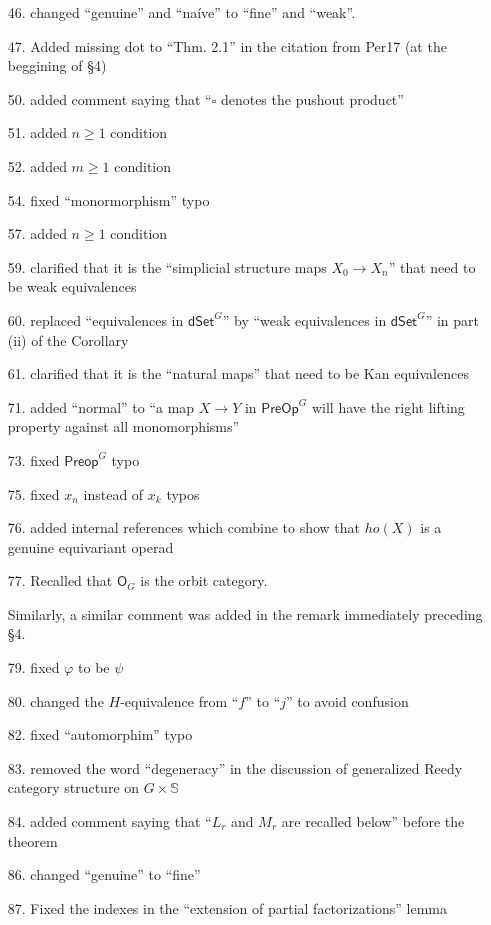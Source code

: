 \documentclass{article}
\begin{document}
\begin{itemize}
\item[46.] changed ``genuine'' and ``na\'ive'' to ``fine'' and ``weak''.
\item[47.] Added missing dot to ``Thm. 2.1'' in the citation from Per17 (at the beggining of \S 4)
\item[50.] added comment saying that ``$\square$ denotes the pushout product''
\item[51.] added $n \geq 1$ condition
\item[52.] added $m \geq 1$ condition
\item[54.] fixed ``monormorphism'' typo
\item[57.] added $n \geq 1$ condition
\item[59.] clarified that it is the ``simplicial structure maps $X_0 \to X_n$'' that need to be weak equivalences
\item[60.] replaced ``equivalences in $\mathsf{dSet}^G$'' by ``weak equivalences in $\mathsf{dSet}^G$'' in part (ii) of the Corollary
\item[61.] clarified that it is the ``natural maps'' that need to be Kan equivalences
\item[71.] added ``normal'' to ``a map $X\to Y$ in $\mathsf{PreOp}^G$ will have the right lifting property against all monomorphisms''
\item[73.] fixed $\mathsf{Preop}^G$ typo
\item[75.] fixed $x_n$ instead of $x_k$ typos
\item[76.] added internal references which combine to show that $ho(X)$ is a genuine equivariant operad
\item[77.] Recalled that $\mathsf{O}_G$ is the orbit category.

Similarly, a similar comment was added in the remark immediately preceding \S 4.
\item[79.] fixed $\varphi$ to be $\psi$
\item[80.] changed the $H$-equivalence from ``$f$'' to ``$j$'' to avoid confusion
\item[82.] fixed ``automorphim'' typo
\item[83.] removed the word ``degeneracy'' in the discussion of generalized Reedy category structure on $G \times \mathbb{S}$
\item[84.] added comment saying that ``$L_r$ and $M_r$ are recalled below'' before the theorem
\item[86.] changed ``genuine'' to ``fine''
\item[87.] Fixed the indexes in the ``extension of partial factorizations'' lemma
\end{itemize}
\end{document}
